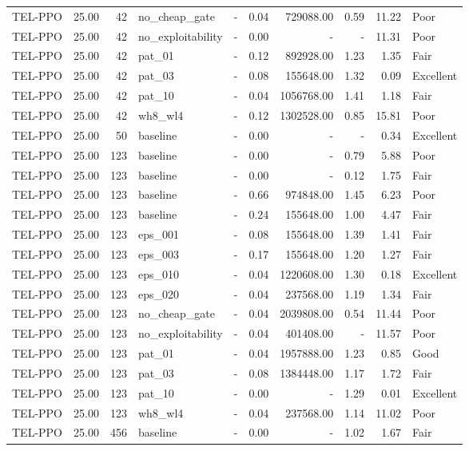 \begin{table}[htbp]
\begin{tabular}{lrrlrrrrrl}
TEL-PPO & 25.00 & 42 & no_cheap_gate & - & 0.04 & 729088.00 & 0.59 & 11.22 & Poor \\
TEL-PPO & 25.00 & 42 & no_exploitability & - & 0.00 & - & - & 11.31 & Poor \\
TEL-PPO & 25.00 & 42 & pat_01 & - & 0.12 & 892928.00 & 1.23 & 1.35 & Fair \\
TEL-PPO & 25.00 & 42 & pat_03 & - & 0.08 & 155648.00 & 1.32 & 0.09 & Excellent \\
TEL-PPO & 25.00 & 42 & pat_10 & - & 0.04 & 1056768.00 & 1.41 & 1.18 & Fair \\
TEL-PPO & 25.00 & 42 & wh8_wl4 & - & 0.12 & 1302528.00 & 0.85 & 15.81 & Poor \\
TEL-PPO & 25.00 & 50 & baseline & - & 0.00 & - & - & 0.34 & Excellent \\
TEL-PPO & 25.00 & 123 & baseline & - & 0.00 & - & 0.79 & 5.88 & Poor \\
TEL-PPO & 25.00 & 123 & baseline & - & 0.00 & - & 0.12 & 1.75 & Fair \\
TEL-PPO & 25.00 & 123 & baseline & - & 0.66 & 974848.00 & 1.45 & 6.23 & Poor \\
TEL-PPO & 25.00 & 123 & baseline & - & 0.24 & 155648.00 & 1.00 & 4.47 & Fair \\
TEL-PPO & 25.00 & 123 & eps_001 & - & 0.08 & 155648.00 & 1.39 & 1.41 & Fair \\
TEL-PPO & 25.00 & 123 & eps_003 & - & 0.17 & 155648.00 & 1.20 & 1.27 & Fair \\
TEL-PPO & 25.00 & 123 & eps_010 & - & 0.04 & 1220608.00 & 1.30 & 0.18 & Excellent \\
TEL-PPO & 25.00 & 123 & eps_020 & - & 0.04 & 237568.00 & 1.19 & 1.34 & Fair \\
TEL-PPO & 25.00 & 123 & no_cheap_gate & - & 0.04 & 2039808.00 & 0.54 & 11.44 & Poor \\
TEL-PPO & 25.00 & 123 & no_exploitability & - & 0.04 & 401408.00 & - & 11.57 & Poor \\
TEL-PPO & 25.00 & 123 & pat_01 & - & 0.04 & 1957888.00 & 1.23 & 0.85 & Good \\
TEL-PPO & 25.00 & 123 & pat_03 & - & 0.08 & 1384448.00 & 1.17 & 1.72 & Fair \\
TEL-PPO & 25.00 & 123 & pat_10 & - & 0.00 & - & 1.29 & 0.01 & Excellent \\
TEL-PPO & 25.00 & 123 & wh8_wl4 & - & 0.04 & 237568.00 & 1.14 & 11.02 & Poor \\
TEL-PPO & 25.00 & 456 & baseline & - & 0.00 & - & 1.02 & 1.67 & Fair \\

\end{tabular}
\end{table}
